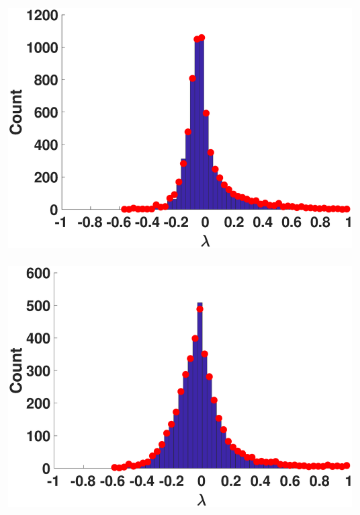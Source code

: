 \begin{figure}[htp]
\begin{subfigure}[t]{0.19\textwidth}
    \includegraphics[width=\textwidth,trim = .4cm 0.5cm 3.5cm 1.3cm,clip]
    {./ndos/pics/marvel}
    \label{fig:marvel_dos}
  \end{subfigure}
  \begin{subfigure}[t]{0.19\textwidth}
    \centering  
    \captionsetup{justification=centering,font=scriptsize}
    \includegraphics[width=\textwidth,trim = .4cm 0.5cm 3.5cm 1.3cm,clip]
    {./ndos/pics/facebook}
    \label{fig:facebook_dos}
  \end{subfigure}
  \begin{subfigure}[t]{0.19\textwidth}
    \centering  
    \captionsetup{justification=centering,font=scriptsize}

\end{subfigure}
\end{figure}

